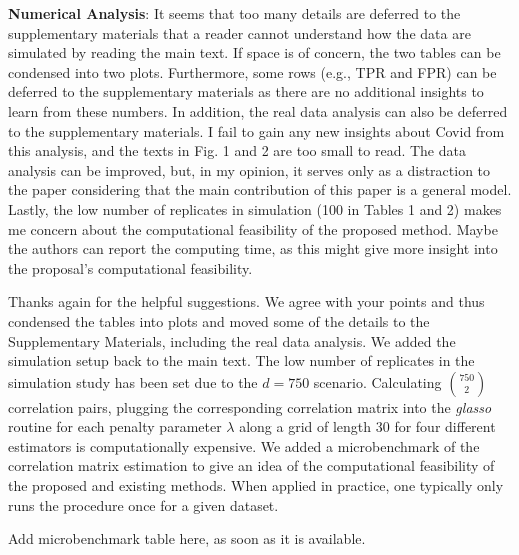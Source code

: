 \begin{point}
    \textbf{Numerical Analysis}: It seems that too many details are deferred to the supplementary materials that a reader cannot understand how the data are simulated by reading the main text. If space is of concern, the two tables can be condensed into two plots. Furthermore, some rows (e.g., TPR and FPR) can be deferred to the supplementary materials as there are no additional insights to learn from these numbers. In addition, the real data analysis can also be deferred to the supplementary materials. I fail to gain any new insights about Covid from this analysis, and the texts in Fig. 1 and 2 are too small to read. The data analysis can be improved, but, in my opinion, it serves only as a distraction to the paper considering that the main contribution of this paper is a general model. Lastly, the low number of replicates in simulation (100 in Tables 1 and 2) makes me concern about the computational feasibility of the proposed method. Maybe the authors can report the computing time, as this might give more insight into the proposal’s computational feasibility.
\end{point}

\begin{reply}
    Thanks again for the helpful suggestions. We agree with your points and thus condensed the tables into plots and moved some of the details to the Supplementary Materials, including the real data analysis. We added the simulation setup back to the main text. The low number of replicates in the simulation study has been set due to the \(d=750\) scenario. Calculating \({750\choose 2}\) correlation pairs, plugging the corresponding correlation matrix into the \textit{glasso} routine for each penalty parameter \(\lambda\) along a grid of length 30 for four different estimators is computationally expensive. We added a microbenchmark of the correlation matrix estimation to give an idea of the computational feasibility of the proposed and existing methods. When applied in practice, one typically only runs the procedure once for a given dataset.
\end{reply}

\begin{change}
    Add microbenchmark table here, as soon as it is available.
\end{change}